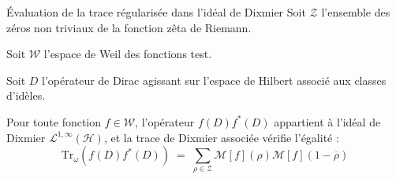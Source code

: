 \documentclass[Riemann_Hypothesis.tex]{subfiles}
\begin{document}
\begin{theorem}[label=th:TraceReg_Connes_fr]{Évaluation de la trace régularisée dans l'idéal de Dixmier}
    Soit $\mathcal{Z}$ l'ensemble des zéros non triviaux de la fonction zêta de Riemann. \par
    Soit $\mathcal{W}$ l'espace de Weil des fonctions test. \par
    Soit $D$ l'opérateur de Dirac agissant sur l'espace de Hilbert associé aux classes d'idèles. \par
    Pour toute fonction $f \in \mathcal{W}$, l'opérateur $f(D)f^*(D)$ appartient à l'idéal de Dixmier $\mathcal{L}^{1,\infty}(\mathcal{H})$, et la trace de Dixmier associée vérifie l'égalité :
    \begin{equation*}
        \mathrm{Tr}_{\omega}\left(f(D)f^*(D)\right) \;=\; \sum_{\rho\in\mathcal{Z}} \mathcal{M}[f](\rho) \mathcal{M}[f](1-\overline{\rho})
    \end{equation*}
\end{theorem}
\end{document}
